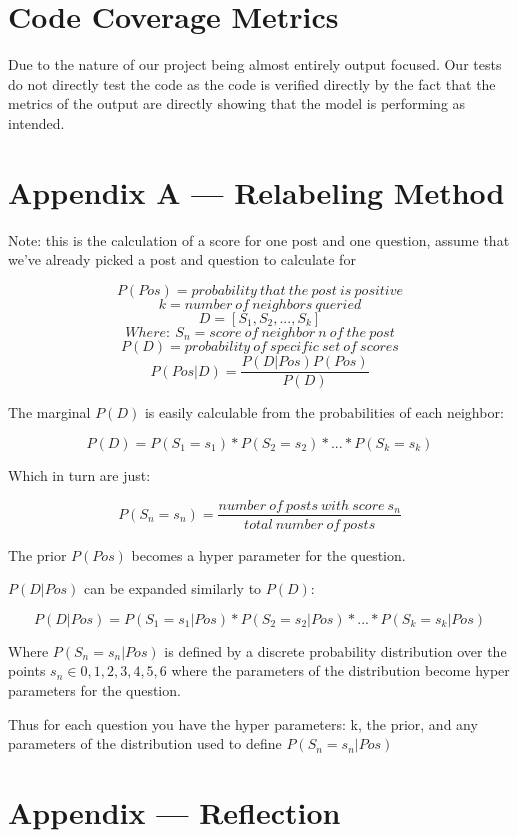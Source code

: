 \documentclass[12pt, titlepage]{article}
\begin{document}
\section{Code Coverage Metrics}
Due to the nature of our project being almost entirely output focused. Our tests do not directly test the code as the code is verified directly by the fact that the metrics of the output are directly showing that the model is performing as intended.




\newpage{}
\section*{Appendix A --- Relabeling Method} \label{apA}

Note: this is the calculation of a score for one post and one question, assume that we've already picked a post and question to calculate for

$$P(Pos) = probability\ that\ the\ post\ is\ positive$$
$$k = number\ of\ neighbors\ queried$$
$$D = [S_{1}, S_{2}, ..., S_{k}]$$
$$Where:\ S_{n} = score\ of\ neighbor\ n\ of\ the\ post$$
$$P(D) = probability\ of\ specific\ set\ of\ scores$$
$$P(Pos|D) = \frac{P(D|Pos)P(Pos)}{P(D)}$$

The marginal $P(D)$ is easily calculable from the probabilities of each neighbor:

$$P(D) = P(S_1 = s_1)*P(S_2 = s_2)*...*P(S_k = s_k)$$

Which in turn are just:

$$P(S_n = s_n) = \frac{number\ of\ posts\ with\ score\ s_n}{total\ number\ of\ posts}$$

The prior $P(Pos)$ becomes a hyper parameter for the question.

$P(D|Pos)$ can be expanded similarly to $P(D)$:

$$P(D|Pos) = P(S_1 = s_1|Pos)*P(S_2 = s_2|Pos)*...*P(S_k = s_k|Pos)$$

Where $P(S_n = s_n|Pos)$ is defined by a discrete probability distribution over the points $s_n \in {0,1,2,3,4,5,6}$ where the parameters of the distribution become hyper parameters for the question.

Thus for each question you have the hyper parameters: k, the prior, and any parameters of the distribution used to define $P(S_n = s_n|Pos)$

\newpage{}
\section*{Appendix --- Reflection}
\end{document}
